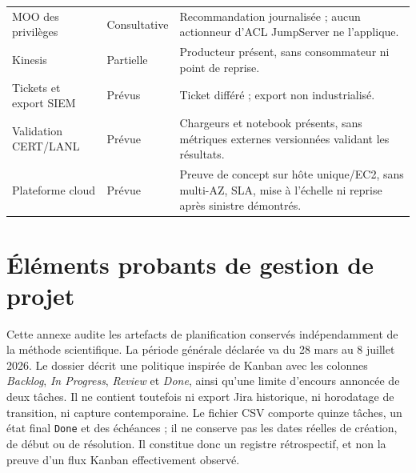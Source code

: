 \documentclass[11pt,a4paper,oneside]{report}
\theoremstyle{definition}
\theoremstyle{plain}
\begin{document}
\begin{longtable}{@{}p{}p{}p{}@{}}
MOO des privilèges & Consultative & Recommandation journalisée ; aucun
actionneur d'ACL JumpServer ne l'applique. \\
Kinesis & Partielle & Producteur présent, sans consommateur ni point de reprise. \\
Tickets et export SIEM & Prévus & Ticket différé ; export non industrialisé. \\
Validation CERT/LANL & Prévue & Chargeurs et notebook présents, sans métriques
externes versionnées validant les résultats. \\
Plateforme cloud & Prévue & Preuve de concept sur hôte unique/EC2, sans
multi-AZ, SLA, mise à l'échelle ni reprise après sinistre démontrés. \\
\bottomrule
\end{longtable}

\chapter{Éléments probants de gestion de projet}
\label{app:project-management}

Cette annexe audite les artefacts de planification conservés indépendamment
de la méthode scientifique. La période générale déclarée va du 28 mars au
8 juillet 2026. Le dossier décrit une politique inspirée de Kanban avec les
colonnes \emph{Backlog}, \emph{In Progress}, \emph{Review} et \emph{Done},
ainsi qu'une limite d'encours annoncée de deux tâches. Il ne contient toutefois
ni export Jira historique, ni horodatage de transition, ni capture
contemporaine. Le fichier CSV comporte quinze tâches, un état final
\texttt{Done} et des échéances ; il ne conserve pas les dates réelles de
création, de début ou de résolution. Il constitue donc un registre
rétrospectif, et non la preuve d'un flux Kanban effectivement observé.
\end{document}

